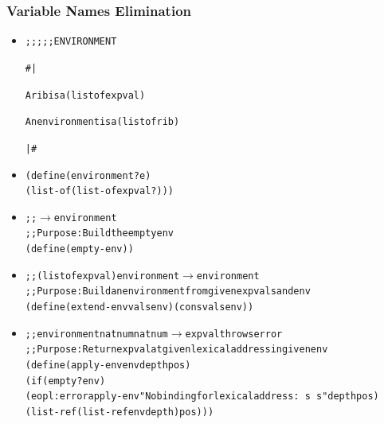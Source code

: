 \documentclass{beamer}
\newcommand{\arrow}{\(\rightarrow\)}
\newcommand{\elist}{\texttt{\textquotesingle{()}}}
\newcommand{\quot}{\texttt{\textquotesingle{}}}
\begin{document}
\begin{frame}[fragile]
\frametitle{Variable Names Elimination}
\begin{scriptsize}
\begin{itemize}
\item<1->
\begin{alltt}
;;;;;    ENVIRONMENT

\#|

A rib is a (listof expval)

An environment is a (listof rib)

|\#
\end{alltt}

\item<2->
\begin{alltt}
(define (environment? e)
  (list-of (list-of expval?)))
\end{alltt}

\item<3->
\begin{alltt}
;;  \arrow{} environment
;; Purpose: Build the empty env
(define (empty-env) \elist{})
\end{alltt}

\item<4->
\begin{alltt}
;; (listof expval) environment \arrow{} environment
;; Purpose: Build an environment from given expvals and env
(define (extend-env vals env) (cons vals env))
\end{alltt}

\item<5->
\begin{alltt}
;; environment natnum natnum \arrow{} expval throws error
;; Purpose: Return expval at given lexical address in given env
(define (apply-env env depth pos)
  (if (empty? env)
      (eopl:error \quot{}apply-env "No binding for lexical address: ~s ~s" depth pos)
      (list-ref (list-ref env depth) pos)))
\end{alltt}

\end{itemize}
\end{scriptsize}
\end{frame}
\end{document}
